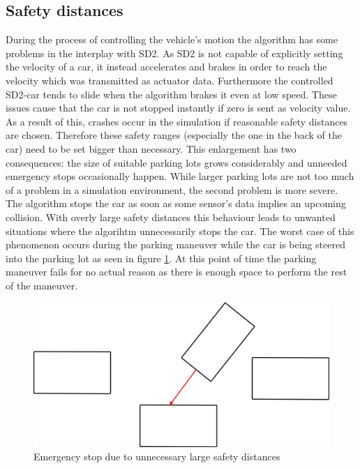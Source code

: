 \documentclass[paper=a4, fontsize=11pt]{scrreprt}
\begin{document}
\subsection{Safety distances} \label{distances}
During the process of controlling the vehicle's motion the algorithm has some problems in the interplay with SD2. As SD2 is not capable of explicitly setting the velocity of a car, it instead accelerates and brakes in order to reach the velocity which was transmitted as actuator data. Furthermore the controlled SD2-car tends to slide when the algorithm brakes it even at low speed. These issues cause that the car is not stopped instantly if zero is sent as velocity value. As a result of this, crashes occur in the simulation if reasonable safety distances are chosen. Therefore these safety ranges (especially the one in the back of the car) need to be set bigger than necessary. This enlargement has two consequences: the size of suitable parking lots grows considerably and unneeded emergency stops occasionally happen. While larger parking lots are not too much of a problem in a simulation environment, the second problem is more severe. The algorithm stops the car as soon as some sensor's data implies an upcoming collision. With overly large safety distances this behaviour leads to unwanted situations where the algorihtm unnecessarily stops the car. The worst case of this phenomenon occurs during the parking maneuver while the car is being steered into the parking lot as seen in figure \ref{false_emergency}. At this point of time the parking maneuver fails for no actual reason as there is enough space to perform the rest of the maneuver.
\begin{figure}[H]
\centering
\includegraphics[scale=0.35]{images_ecu/emergency_stop.png}
\caption{Emergency stop due to unnecessary large safety distances}
\label{false_emergency}
\end{figure}
\end{document}
